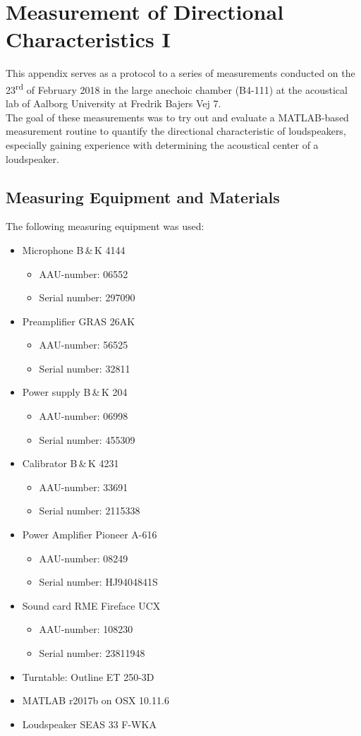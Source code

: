 \chapter{Measurement of Directional Characteristics I}\label{ax:directional_1}
This appendix serves as a protocol to a series of measurements conducted on the 23\textsuperscript{rd} of February 2018 in the large anechoic chamber (B4-111) at the acoustical lab of Aalborg University at Fredrik Bajers Vej 7.\\
The goal of these measurements was to try out and evaluate a MATLAB-based measurement routine to quantify the directional characteristic of loudspeakers, especially gaining experience with determining the acoustical center of a loudspeaker.

\section*{Measuring Equipment and Materials}
The following measuring equipment was used:
\begin{itemize}[noitemsep]
\item Microphone B\,\&\,K 4144
\begin{itemize}[noitemsep]
\item AAU-number: 06552
\item Serial number: 297090
\end{itemize}
\item Preamplifier GRAS 26AK
\begin{itemize}[noitemsep]
\item AAU-number: 56525
\item Serial number: 32811
\end{itemize}
\item Power supply B\,\&\,K 204
\begin{itemize}
\item AAU-number: 06998
\item Serial number: 455309
\end{itemize}
\item Calibrator B\,\&\,K 4231
\begin{itemize}[noitemsep]
\item AAU-number: 33691
\item Serial number: 2115338
\end{itemize}
\item Power Amplifier Pioneer A-616
\begin{itemize}[noitemsep]
\item AAU-number: 08249
\item Serial number: HJ9404841S
\end{itemize}
\item Sound card RME Fireface UCX
\begin{itemize}[noitemsep]
\item AAU-number: 108230
\item Serial number: 23811948
\end{itemize}
\item Turntable: Outline ET 250-3D
\item MATLAB r2017b on OSX 10.11.6
\item Loudspeaker SEAS 33 F-WKA
\end{itemize}

